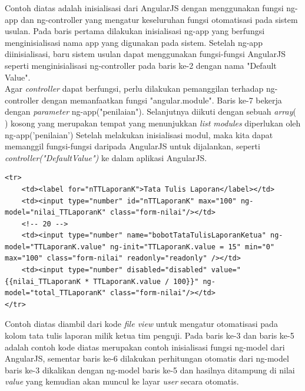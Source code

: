 	Contoh diatas adalah inisialisasi dari AngularJS dengan menggunakan fungsi ng-app dan ng-controller yang mengatur keseluruhan fungsi otomatisasi pada sistem usulan. Pada baris pertama dilakukan inisialisasi ng-app yang berfungsi menginisialisasi nama app yang digunakan pada sistem. Setelah ng-app diinisialisasi, baru sistem usulan dapat menggunakan fungsi-fungsi AngularJS seperti menginisialisasi ng-controller pada baris ke-2 dengan nama "Default Value".\\
	Agar \textit{controller} dapat berfungsi, perlu dilakukan pemanggilan terhadap ng-controller dengan memanfaatkan fungsi "angular.module". Baris ke-7 bekerja dengan \textit{parameter} ng-app("penilaian"). Selanjutnya diikuti dengan sebuah \textit{array}(\[\]) kosong yang merupakan tempat yang menunjukkan \textit{list modules} diperlukan oleh ng-app('penilaian') Setelah melakukan inisialisasi modul, maka kita dapat memanggil fungsi-fungsi daripada AngularJS untuk dijalankan, seperti \textit{controller("DefaultValue")} ke dalam aplikasi AngularJS.
	
\begin{lstlisting}
<tr>
	<td><label for="nTTLaporanK">Tata Tulis Laporan</label></td>
	<td><input type="number" id="nTTLaporanK" max="100" ng-model="nilai_TTLaporanK" class="form-nilai"/></td>
	<!-- 20 -->
	<td><input type="number" name="bobotTataTulisLaporanKetua" ng-model="TTLaporanK.value" ng-init="TTLaporanK.value = 15" min="0" max="100" class="form-nilai" readonly="readonly" /></td>
	<td><input type="number" disabled="disabled" value="{{nilai_TTLaporanK * TTLaporanK.value / 100}}" ng-model="total_TTLaporanK" class="form-nilai"/></td>
</tr>
\end{lstlisting}
	
	Contoh diatas diambil dari kode \textit{file view} untuk mengatur otomatisasi pada kolom tata tulis laporan milik ketua tim penguji. Pada baris ke-3 dan baris ke-5 adalah contoh kode diatas merupakan contoh inisialisasi fungsi ng-model dari AngularJS, sementar baris ke-6 dilakukan perhitungan otomatis dari ng-model baris ke-3 dikalikan dengan ng-model baris ke-5 dan hasilnya ditampung di nilai \textit{value} yang kemudian akan muncul ke layar \textit{user} secara otomatis.
	
